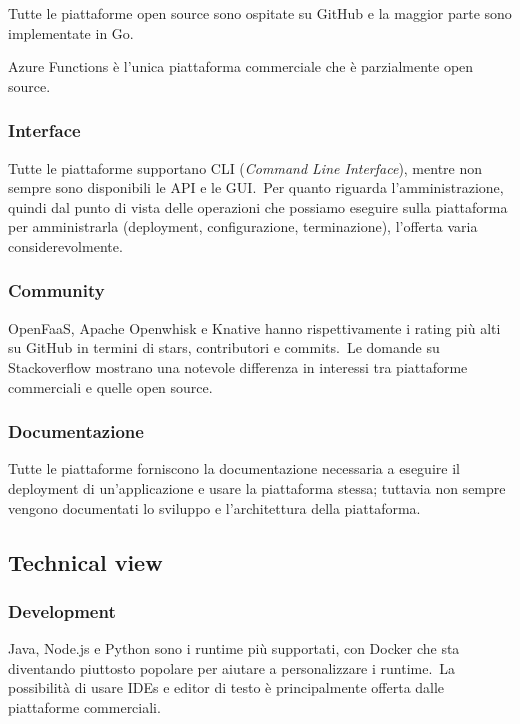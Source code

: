 Tutte le piattaforme open source sono ospitate su GitHub e la maggior parte sono implementate in Go.\

Azure Functions è l'unica piattaforma commerciale che è parzialmente open source.\

\subsubsection{Interface}

Tutte le piattaforme supportano CLI (\textit{Command Line Interface}), mentre non sempre sono disponibili le API e le GUI.\
Per quanto riguarda l'amministrazione, quindi dal punto di vista delle operazioni che possiamo eseguire sulla piattaforma per amministrarla (deployment, configurazione, terminazione), l'offerta varia considerevolmente.

\subsubsection{Community}

OpenFaaS, Apache Openwhisk e Knative hanno rispettivamente i rating più alti su GitHub in termini di stars, contributori e commits.\
Le domande su Stackoverflow mostrano una notevole differenza in interessi tra piattaforme commerciali e quelle open source.

\subsubsection{Documentazione}

Tutte le piattaforme forniscono la documentazione necessaria a eseguire il deployment di un'applicazione e usare la piattaforma stessa; tuttavia non sempre vengono documentati lo sviluppo e l'architettura della piattaforma.\

\subsection{Technical view}

\subsubsection{Development}

Java, Node.js e Python sono i runtime più supportati, con Docker che sta diventando piuttosto popolare per aiutare a personalizzare i runtime.\
La possibilità di usare IDEs e editor di testo è principalmente offerta dalle piattaforme commerciali.

